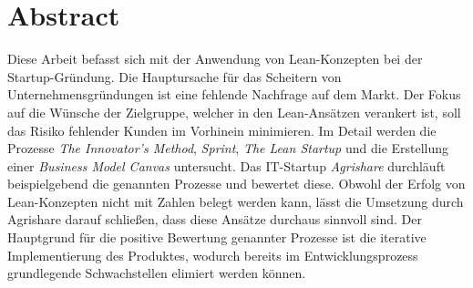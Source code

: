 \chapter*{Abstract}
Diese Arbeit befasst sich mit der Anwendung von Lean-Konzepten bei der Startup-Gründung. Die Hauptursache für das Scheitern von Unternehmensgründungen ist eine fehlende Nachfrage auf dem Markt. Der Fokus auf die Wünsche der Zielgruppe, welcher in den Lean-Ansätzen verankert ist, soll das Risiko fehlender Kunden im Vorhinein minimieren. Im Detail werden die Prozesse \textit{The Innovator's Method}, \textit{Sprint}, \textit{The Lean Startup} und die Erstellung einer \textit{Business Model Canvas} untersucht. Das IT-Startup \textit{Agrishare} durchläuft beispielgebend die genannten Prozesse und bewertet diese. Obwohl der Erfolg von Lean-Konzepten nicht mit Zahlen belegt werden kann, lässt die Umsetzung durch Agrishare darauf schließen, dass diese Ansätze durchaus sinnvoll sind. Der Hauptgrund für die positive Bewertung genannter Prozesse ist die iterative Implementierung des Produktes, wodurch bereits im Entwicklungsprozess grundlegende Schwachstellen elimiert werden können.